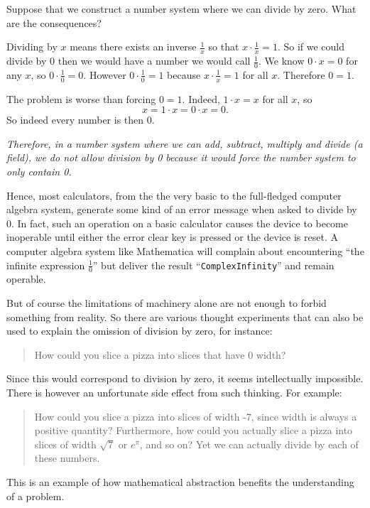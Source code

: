 \documentclass[12pt]{article}
\begin{document}
Suppose that we construct a number system where we can divide by zero.  What are the consequences?

Dividing by $x$ means there exists an inverse $\displaystyle \frac{1}{x}$ 
so that $\displaystyle x\cdot\frac{1}{x}=1$.  So if we could divide by $0$ 
then we would have a number we would call $\displaystyle \frac{1}{0}$.
We know $0\cdot x=0$ for any $x$, so $\displaystyle 0\cdot \frac{1}{0}=0$.  However $\displaystyle 0\cdot\frac{1}{0}=1$ because $\displaystyle x\cdot\frac{1}{x}=1$ for all $x$.  Therefore $0=1$.

The problem is worse than forcing $0=1$.  Indeed, $1\cdot x=x$ for all $x$, so
\[x=1\cdot x=0\cdot x=0.\]
So indeed every number is then 0.

\emph{Therefore, in a number system where we can add, subtract, multiply and divide (a field), we do not allow division by 0 because it would force the number system to only contain 0.}

Hence, most calculators, from the the very basic to the full-fledged computer algebra system, generate some kind of an error message when asked to divide by 0. In fact, such an operation on a basic calculator causes the device to become inoperable until either the error clear key is pressed or the device is reset. A computer algebra system like Mathematica will complain about encountering ``the infinite expression $\frac{1}{0}$'' but deliver the result ``\verb=ComplexInfinity='' and remain operable.

But of course the limitations of machinery alone are not enough to forbid something from reality. So there are various thought experiments that can also be used to explain the omission of division by zero, for instance:
\begin{quote}
How could you slice a pizza into slices that have 0 width?
\end{quote}
Since this would correspond to division by zero, it seems intellectually impossible.  There is however an unfortunate side effect from such thinking.
For example:
\begin{quote}
How could you slice a pizza into slices of width -7, since width is always a positive
quantity?
Furthermore, how could you actually slice a pizza into slices of width $\sqrt{7}$ or $e^\pi$, and so on?  Yet we can actually divide by each of these
numbers.
\end{quote}
This is an example of how mathematical abstraction benefits the understanding
of a problem.

\end{document}
